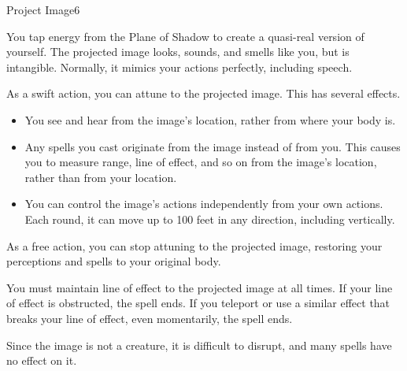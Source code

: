 \begin{spellsection}{Project Image}{6}
    \begin{spellheader}
    \end{spellheader}
    \begin{spellcontent}
        \begin{spelltargetinginfo}
            \spellrng{\rngmed}
        \end{spelltargetinginfo}
        \begin{spelleffects}
            \spelleffect You tap energy from the Plane of Shadow to create a quasi-real version of yourself. The projected image looks, sounds, and smells like you, but is intangible. Normally, it mimics your actions perfectly, including speech.
            \par As a swift action, you can attune to the projected image. This has several effects.
            \begin{itemize}
                \item You see and hear from the image's location, rather from where your body is.
                \item Any spells you cast originate from the image instead of from you. This causes you to measure range, line of effect, and so on from the image's location, rather than from your location.
                \item You can control the image's actions independently from your own actions. Each round, it can move up to 100 feet in any direction, including vertically.
            \end{itemize}

            As a free action, you can stop attuning to the projected image, restoring your perceptions and spells to your original body.

            \spelldur \durmed \dismissable
        \end{spelleffects}
    \end{spellcontent}
    \begin{spellfooter}
        \spellnotes You must maintain line of effect to the projected image at all times. If your line of effect is obstructed, the spell ends. If you teleport or use a similar effect that breaks your line of effect, even momentarily, the spell ends.

        Since the image is not a creature, it is difficult to disrupt, and many spells have no effect on it.
        \miscastexplode
    \end{spellfooter}
\end{spellsection}

